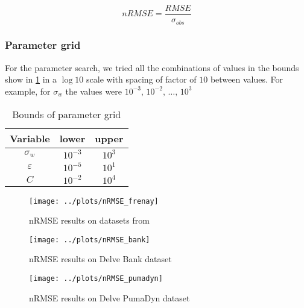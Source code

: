 \begin{equation}
    nRMSE = \frac{RMSE}{\sigma_{obs}}
\end{equation}

\subsubsection{Parameter grid}

For the parameter search, we tried all the combinations of values
in the bounds show in \cref{tab:paramgrid} in a $\log 10$ scale with
spacing of factor of $10$ between values. For example, for $\sigma_w$ the values
were $10^{-3},\,10^{-2},\,\dots,\,10^{3}$

\begin{table}[H]
    \caption{Bounds of parameter grid}%
    \label{tab:paramgrid}
    \begin{tabular}{ccc}
        \toprule
        Variable & lower & upper \\
        \midrule
        $\sigma_w$ & $10^{-3}$ & $10^3$ \\
        $\varepsilon$ & $10^{-5}$ & $10^1$ \\
        $C$ & $10^{-2}$ & $10^4$ \\
        \bottomrule
    \end{tabular}
\end{table}

\begin{figure}
    \texttt{[image: ../plots/nRMSE\_frenay]}
    \caption{nRMSE results on datasets from \cite{frenayParameterinsensitiveKernelExtreme2011}}
\end{figure}

\begin{figure}
    \texttt{[image: ../plots/nRMSE\_bank]}
    \caption{nRMSE results on Delve Bank dataset}
\end{figure}

\begin{figure}
    \texttt{[image: ../plots/nRMSE\_pumadyn]}
    \caption{nRMSE results on Delve PumaDyn dataset}
\end{figure}
